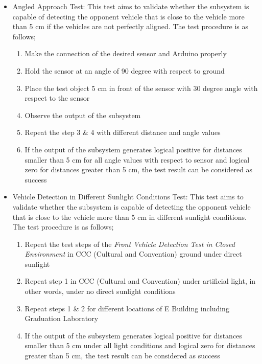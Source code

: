 \documentclass[a4paper,12pt]{article}
\begin{document}
\begin{itemize}
		\item {Angled Approach Test:}
			This test aims to validate whether the subsystem is capable of detecting the opponent vehicle that is close to the vehicle more than 5 cm if the vehicles are not perfectly aligned. The test procedure is as follows;
			\begin{enumerate}
				\item Make the connection of the desired sensor and Arduino properly \vspace{-0.2cm}
				\item Hold the sensor at an angle of 90 degree with respect to ground \vspace{-0.2cm}
				\item Place the test object 5 cm in front of the sensor with 30 degree angle with respect to the sensor \vspace{-0.2cm}
				\item Observe the output of the subsystem \vspace{-0.2cm}
				\item Repeat the step 3 \& 4 with different distance and angle values \vspace{-0.2cm}
				\item If the output of the subsystem generates logical positive for distances smaller than 5 cm for all angle values with respect to sensor and logical zero for distances greater than 5 cm, the test result can be considered as success \vspace{-0.2cm}
			\end{enumerate}
		
		\item Vehicle Detection in Different Sunlight Conditions Test:
			This test aims to validate whether the subsystem is capable of detecting the opponent vehicle that is close to the vehicle more than 5 cm in different sunlight conditions. The test procedure is as follows; 		
			\begin{enumerate}
				\item Repeat the test steps of the \textit{Front Vehicle Detection Test in Closed Environment} in CCC (Cultural and Convention) ground under direct sunlight \vspace{-0.2cm}
				\item Repeat step 1 in CCC (Cultural and Convention) under artificial light, in other words, under no direct sunlight conditions \vspace{-0.2cm}
				\item Repeat steps 1 \& 2 for different locations of E Building including Graduation Laboratory \vspace{-0.2cm}
				\item If the output of the subsystem generates logical positive for distances smaller than 5 cm under all light conditions and logical zero for distances greater than 5 cm, the test result can be considered as success \vspace{-0.2cm}
			\end{enumerate}
			
		\end{itemize}
	
\end{document}
